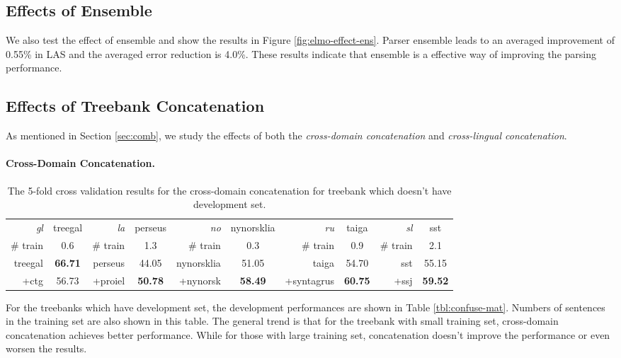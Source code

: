 \documentclass[11pt,a4paper]{article}
\begin{document}
\subsection{Effects of Ensemble}

We also test the effect of ensemble and show
the results in Figure \ref{fig:elmo-effect-ens}.
Parser ensemble leads to an averaged improvement of 0.55\% in LAS
and the averaged error reduction is 4.0\%.
These results indicate that ensemble is a effective way of
improving the parsing performance.

\subsection{Effects of Treebank Concatenation}\label{sec:treebank-concat}
As mentioned in Section \ref{sec:comb},
we study the effects of both the \textit{cross-domain concatenation} and \textit{cross-lingual concatenation}.
\paragraph{Cross-Domain Concatenation.}


\begin{table}[t]
	\centering
	\small
	\begin{tabular}{rc || rc || rc || rc || rc}
		\textit{gl} & treegal & \textit{la} & perseus & \textit{no} & nynorsklia & \textit{ru} & taiga & \textit{sl} & sst \\
		\# train & 0.6 & \# train & 1.3 & \# train & 0.3 & \# train & 0.9 & \# train & 2.1 \\
		\hline
		treegal & \textbf{66.71} & perseus & 44.05 & nynorsklia & 51.05 & taiga & 54.70 & sst & 55.15 \\
		+ctg & 56.73 & +proiel & \textbf{50.78} & +nynorsk & \textbf{58.49} & +syntagrus & \textbf{60.75} & +ssj & \textbf{59.52} \\
	\end{tabular}
	\caption{The 5-fold cross validation results for the cross-domain concatenation for treebank which doesn't have development set.}\label{tbl:confuse-mat2}
\end{table}

For the treebanks which have development set, the development performances
are shown in Table \ref{tbl:confuse-mat}.
Numbers of sentences in the training set are also shown in this table.
The general trend is that for the treebank with small training set,
cross-domain concatenation achieves better performance.
While for those with large training set, concatenation doesn't improve
the performance or even worsen the results.
\end{document}
